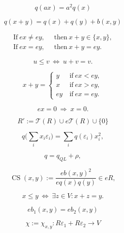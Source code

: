 \documentclass{article}
\begin{document}
\begin{equation}\label{eq:0.1}
q(ax)=a^2q(x)
\end{equation}

\begin{equation}\label{eq:0.2}
q(x+y)= q(x)+q(y)+b(x,y)
\end{equation}

\begin{align}
\text{If}\ ex\ne ey, & \ \text{ then} \ x+y\in\{x,y\}, \label{eq:0.3} \\
\text{If}\ ex= ey,& \ \text{ then} \ x+y=ey. \label{eq:0.4}
\end{align}

\begin{equation}\label{eq:0.5}
u\le v {\ {\Leftrightarrow} \ } u+v=v.
\end{equation}

\begin{equation}\label{eq:0.6}
x+y=\begin{cases} y&\ \text{if}\ ex<ey,\\
x&\ \text{if}\ ex>ey,\\
ey&\ \text{if}\ ex=ey.
\end{cases}
\end{equation}

\begin{equation}\label{eq:0.7}
ex=0 {\ {\Rightarrow} \ } x=0.
\end{equation}

$$R':={\mathcal T}(R)\cup e{\mathcal T}(R)\cup\{0\}$$

\begin{equation}\label{eq:0.8}
q\bigg(\sum_ix_i{\varepsilon}_i\bigg)=\sum_i q({\varepsilon}_i)x_i^2,
\end{equation}

\begin{equation}\label{eq:0.9}
q=q_{QL}+\rho,
\end{equation}

\begin{equation}\label{eq:0.10}
{\operatorname{CS}}(x,y):=\frac{eb(x,y)^2}{eq(x)q(y)}\in eR,
\end{equation}

$$x\le y {\ {\Leftrightarrow} \ } \exists z\in V: x+z=y.$$

\begin{equation}\label{eq:II.5.1}
eb_1(x,y)=eb_2(x,y)\end{equation}

\begin{equation}\label{eq:II.5.2}
\chi:=\chi_{x,y}:R{\varepsilon}_1+R{\varepsilon}_2\to V\end{equation}
\end{document}
